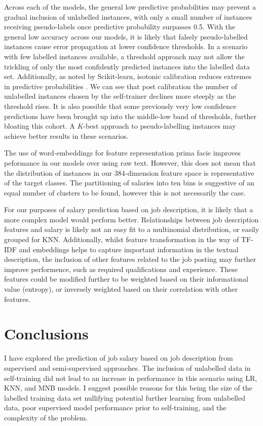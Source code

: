 \documentclass[11pt]{article}
\begin{document}
Across each of the models, the general low predictive probabilities may prevent a gradual inclusion of unlabelled instances, 
with only a small number of instances receiving pseudo-labels once predictive probability surpasses 0.5.
With the general low accuracy across our models, it is likely that falsely pseudo-labelled instances cause error propagation at lower confidence thresholds.
In a scenario with few labelled instances available, a threshold approach may not allow the trickling of only the most confidently predicted instances into the labelled data set.
Additionally, as noted by Scikit-learn, isotonic calibration reduces extremes in predictive probabilities \citep{sklearn}. 
We can see that post calibration the number of unlabelled instances chosen by the self-trainer declines 
more steeply as the threshold rises. It is also possible that some previously very low confidence predictions 
have been brought up into the middle-low band of thresholds, further bloating this cohort.
A $K$-best approach to pseudo-labelling instances may achieve better results in these scenarios.

The use of word-embeddings for feature representation prima facie improves peformance in our models over using raw text.
However, this does not mean that the distribution of instances in our 384-dimension feature space is representative of the target classes.
The partitioning of salaries into ten bins is suggestive of an equal number of clusters to be found, however this is not necessarily the case. 

For our purposes of salary prediction based on job description, it is likely that a more complex model would perform better. 
Relationships between job description features and salary is likely not an easy fit to a multinomial distribution, or easily grouped for KNN.
Additionally, whilst feature transformation in the way of TF-IDF and embeddings helps to capture important information in the textual description,
the inclusion of other features related to the job posting may further improve performence, such as required qualifications and experience.
These features could be modified further to be weighted based on their informational value (entropy), or inversely weighted based on their correlation with other features.

\section{Conclusions}
I have explored the prediction of job salary based on job description from supervised and semi-supervised approaches. 
The inclusion of unlabelled data in self-training did not lead to an increase in performance in this scenario using LR, KNN, and MNB models.
I suggest possible reasons for this being the size of the labelled training data set nullifying potential further learning from unlabelled data, 
poor supervised model performance prior to self-training, and the complexity of the problem.

\nocite{*}


\end{document}
